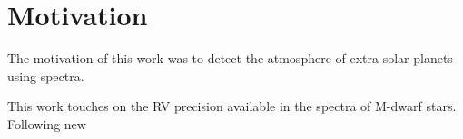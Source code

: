 
\section{Motivation}


The motivation of this work was to detect the atmosphere of extra solar planets using \nir{} spectra.

This work touches on the RV precision available in the \nir spectra of M-dwarf stars. Following new